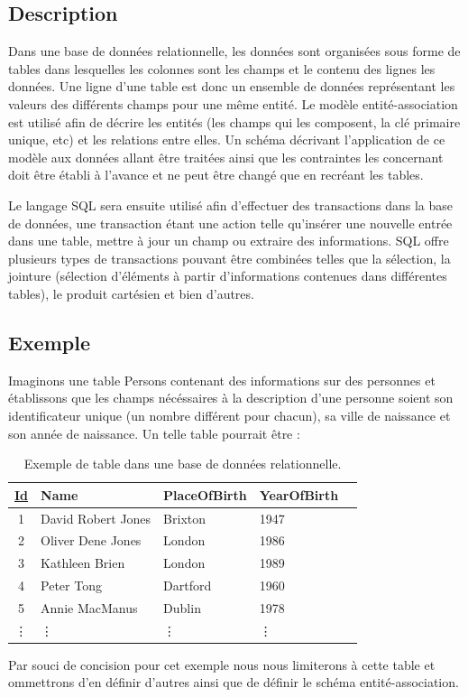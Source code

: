 \documentclass[11pt]{article}
\begin{document}
\subsection{Description}
Dans une base de données relationnelle, les données sont organisées sous forme de tables dans lesquelles les colonnes sont les champs et le contenu des lignes les données. Une ligne d'une table est donc un ensemble de données représentant les valeurs des différents champs pour une même entité. Le modèle entité-association est utilisé afin de décrire les entités (les champs qui les composent, la clé primaire unique, etc) et les relations entre elles. Un schéma décrivant l'application de ce modèle aux données allant être traitées ainsi que les contraintes les concernant doit être établi à l'avance et ne peut être changé que en recréant les tables.

Le langage SQL sera ensuite utilisé afin d'effectuer des transactions dans la base de données, une transaction étant une action telle qu'insérer une nouvelle entrée dans une table, mettre à jour un champ ou extraire des informations. SQL offre plusieurs types de transactions pouvant être combinées telles que la sélection, la jointure (sélection d'éléments à partir d'informations contenues dans différentes tables), le produit cartésien et bien d'autres. 
\subsection{Exemple}
Imaginons une table Persons contenant des informations sur des personnes et établissons que les champs nécéssaires à la description d'une personne soient son identificateur unique (un nombre différent pour chacun), sa ville de naissance et son année de naissance. Un telle table pourrait être :
\begin{table}[H]
  \centering
  \begin{center}
    \begin{tabular}{| c | l | l | l | l |}
      \hline
      \textbf{\underline{Id}} & \textbf{Name} & \textbf{PlaceOfBirth} & \textbf{YearOfBirth} \\
      \hline
      \hline
      1 & David Robert Jones & Brixton & 1947 \\
      \hline
      2 & Oliver Dene Jones & London & 1986  \\
      \hline
      3 & Kathleen Brien & London & 1989 \\
      \hline
      4 & Peter Tong & Dartford & 1960 \\
      \hline
      5 & Annie MacManus & Dublin & 1978 \\
      \hline
      \vdots & \vdots & \vdots & \vdots \\
    \end{tabular}
  \end{center} 
  \caption{Exemple de table dans une base de données relationnelle.}
\end{table}
Par souci de concision pour cet exemple nous nous limiterons à cette table et ommettrons d'en définir d'autres ainsi que de définir le schéma entité-association.
\end{document}
